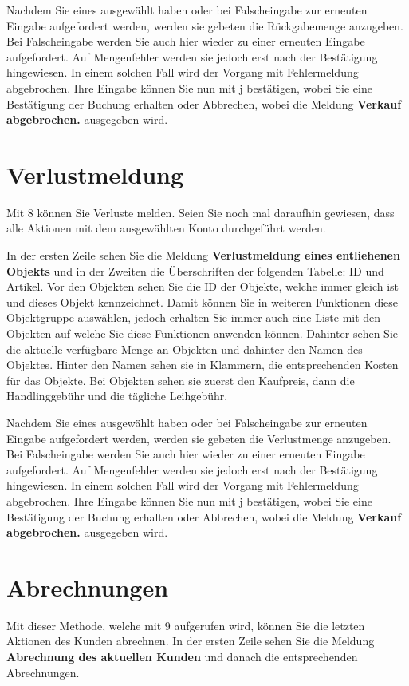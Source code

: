 ﻿\documentclass[a4paper,12pt,titlepage]{article}
\newcommand\enquote[1]{{\ttfamily \bfseries #1}}
\begin{document}
Nachdem Sie eines ausgewählt haben oder bei Falscheingabe zur erneuten Eingabe aufgefordert werden,
 werden sie gebeten die Rückgabemenge anzugeben.
Bei Falscheingabe werden Sie auch hier wieder zu einer erneuten Eingabe aufgefordert.
Auf Mengenfehler werden sie jedoch erst nach der Bestätigung hingewiesen.
In einem solchen Fall wird der Vorgang mit Fehlermeldung abgebrochen.
Ihre Eingabe können Sie nun mit j bestätigen,
 wobei Sie eine Bestätigung der Buchung erhalten oder Abbrechen,
 wobei die Meldung \enquote{Verkauf abgebrochen.} ausgegeben wird.

\section{Verlustmeldung}
Mit 8 können Sie Verluste melden.
Seien Sie noch mal daraufhin gewiesen, dass alle Aktionen mit dem ausgewählten Konto durchgeführt werden.

In der ersten Zeile sehen Sie die Meldung \enquote{Verlustmeldung eines entliehenen Objekts}
 und in der Zweiten die Überschriften der folgenden Tabelle: ID und Artikel.
Vor den Objekten sehen Sie die ID der Objekte, welche immer gleich ist und dieses Objekt kennzeichnet.
Damit können Sie in weiteren Funktionen diese Objektgruppe auswählen,
jedoch erhalten Sie immer auch eine Liste mit den Objekten auf welche Sie diese Funktionen anwenden können.
Dahinter sehen Sie die aktuelle verfügbare Menge an Objekten und dahinter den Namen des Objektes.
Hinter den Namen sehen sie in Klammern, die entsprechenden Kosten für das Objekte.
Bei Objekten sehen sie zuerst den Kaufpreis, dann die Handlinggebühr und die tägliche Leihgebühr.

Nachdem Sie eines ausgewählt haben oder bei Falscheingabe zur erneuten Eingabe aufgefordert werden,
 werden sie gebeten die Verlustmenge anzugeben.
Bei Falscheingabe werden Sie auch hier wieder zu einer erneuten Eingabe aufgefordert.
Auf Mengenfehler werden sie jedoch erst nach der Bestätigung hingewiesen.
In einem solchen Fall wird der Vorgang mit Fehlermeldung abgebrochen.
Ihre Eingabe können Sie nun mit j bestätigen, wobei Sie eine Bestätigung der Buchung erhalten oder Abbrechen,
 wobei die Meldung \enquote{Verkauf abgebrochen.} ausgegeben wird.

\section{Abrechnungen}
Mit dieser Methode, welche mit 9 aufgerufen wird, können Sie die letzten Aktionen des Kunden abrechnen.
In der ersten Zeile sehen Sie die Meldung \enquote{Abrechnung des aktuellen Kunden} und danach die entsprechenden Abrechnungen.
\end{document}
